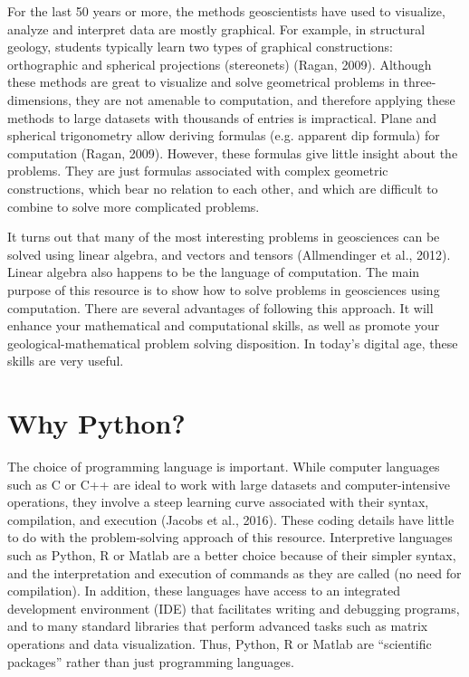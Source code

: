 \documentclass[a4paper , 12pt]{book}
\begin{document}
For the last 50 years or more, the methods geoscientists have used to visualize, analyze and interpret data are mostly graphical. For example, in structural geology, students typically learn two types of graphical constructions: orthographic and  spherical projections (stereonets) (Ragan, 2009). Although these methods are great to visualize and solve geometrical problems in three-dimensions, they are not amenable to computation, and therefore applying these methods to large datasets with thousands of entries is impractical. Plane and spherical trigonometry allow deriving formulas (e.g. apparent dip formula) for computation (Ragan, 2009). However, these formulas give little insight about the problems. They are just formulas associated with complex geometric constructions, which bear no relation to each other, and which are difficult to combine to solve more complicated problems.

It turns out that many of the most interesting problems in geosciences can be solved using linear algebra, and vectors and tensors (Allmendinger et al., 2012). Linear algebra also happens to be the language of computation. The main purpose of this resource is to show how to solve problems in geosciences using computation. There are several advantages of following this approach. It will enhance your mathematical and computational skills, as well as promote your geological-mathematical problem solving disposition. In today’s digital age, these skills are very useful.

\section{Why Python?}

The choice of programming language is important. While computer languages such as C or C++ are ideal to work with large datasets and computer-intensive operations, they involve a steep learning curve associated with their syntax, compilation, and execution (Jacobs et al., 2016). These coding details have little to do with the problem-solving approach of this resource. Interpretive languages such as Python, R or Matlab are a better choice because of their simpler syntax, and the interpretation and execution of commands as they are called (no need for compilation). In addition, these languages have access to an integrated development environment (IDE) that facilitates writing and debugging programs, and to many standard libraries that perform advanced tasks such as matrix operations and data visualization. Thus, Python, R or Matlab are “scientific packages” rather than just programming languages.
\end{document}
